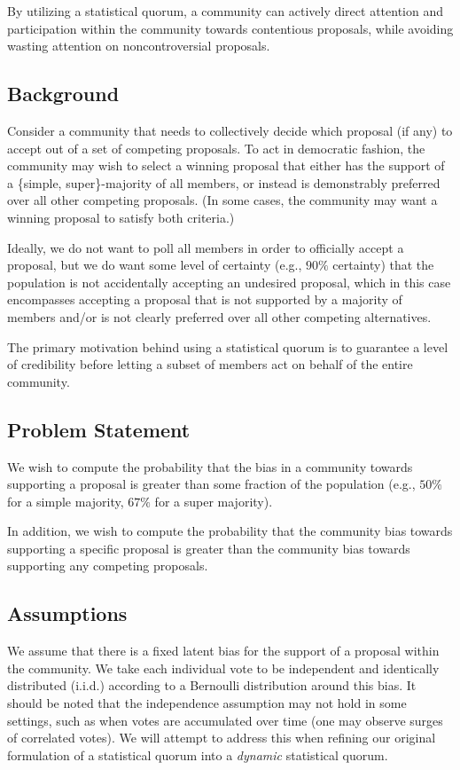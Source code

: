 \documentclass[format=acmsmall, review=true, screen=true, anonymous=true]{acmart}
\begin{document}
By utilizing a statistical quorum, a community can actively direct attention and participation within the community towards contentious proposals, while avoiding wasting attention on noncontroversial proposals.

\subsection{Background}
Consider a community that needs to collectively decide which proposal (if any) to accept out of a set of competing proposals.
To act in democratic fashion, the community may wish to select a winning proposal that either has the support of a \{simple, super\}-majority of all members, or instead is demonstrably preferred over all other competing proposals.  (In some cases, the community may want a winning proposal to satisfy both criteria.)

Ideally, we do not want to poll all members in order to officially accept a proposal, but we do want some level of certainty (e.g., $90\%$ certainty) that
the population is not accidentally accepting an undesired proposal, which in this case encompasses accepting a proposal that is not supported by a majority of members and/or is not clearly preferred over all other competing alternatives.

The primary motivation behind using a statistical quorum is to guarantee a level of credibility before letting a subset of members act on behalf of the entire community.

\subsection{Problem Statement}
We wish to compute the probability that the bias in a community towards supporting a proposal is greater than some
fraction of the population (e.g., $50\%$ for a simple majority, $67\%$ for a super majority).

In addition, we wish to compute the probability that the community bias towards supporting a specific proposal is greater than the community bias towards supporting any competing proposals.

\subsection{Assumptions}
We assume that there is a fixed latent bias for the support of a proposal within the community.  We take each individual vote to be independent and identically distributed (i.i.d.) according to a Bernoulli distribution around this bias.  It should be noted that the independence assumption may not hold in some settings, such as when votes are accumulated over time (one may observe surges of correlated votes).  We will attempt to address this when refining our original formulation of a statistical quorum into a \textit{dynamic} statistical quorum.
\end{document}
